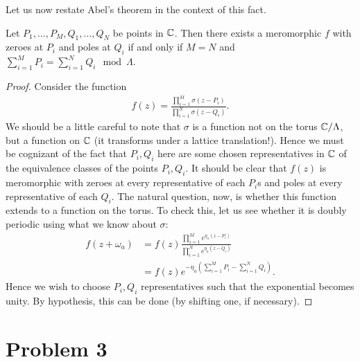 \documentclass{../mathnotes}
\begin{document}
Let us now restate Abel's theorem in the context of this fact.
\begin{thm}
    Let $P_1,\ldots,P_M,Q_1,\ldots,Q_N$ be points in $\mathbb{C}$. Then there exists a meromorphic $f$ with zeroes at $P_i$ and poles at $Q_i$
    if and only if $M=N$ and $\sum_{i=1}^M P_i=\sum_{i=1}^NQ_i\mod\Lambda$.
\end{thm}
\begin{proof}
    Consider the function
    \begin{align*}
        f(z)=\frac{\prod_{i=1}^M\sigma(z-P_i)}{\prod_{i=1}^N\sigma(z-Q_i)}.
    \end{align*}
    We should be a little careful to note that $\sigma$ is a function not on the torus $\mathbb{C}/\Lambda$, but a function on $\mathbb{C}$ (it transforms under a lattice
    translation!). Hence we must be cognizant of the fact that $P_i,Q_i$ here are some chosen representatives in $\mathbb{C}$ of the equivalence classes of the points $P_i,Q_i$.
    It should be clear that $f(z)$ is meromorphic with zeroes at every representative of each $P_i$s and poles at every representative of each $Q_i$.
    The natural question, now, is whether this function extends to a function on the torus. 
    To check this, let us see whether it is doubly periodic using what we know about $\sigma$:
    \begin{align*}
        f(z+\omega_a)&=f(z)\frac{\prod_{i=1}^Me^{\eta_a(z-P_i)}}{\prod_{i=1}^Ne^{\eta_a(z-Q_i)}}\\
        &=f(z)e^{-\eta_a\left( \sum_{i=1}^MP_i-\sum_{i=1}^NQ_i \right)}.
    \end{align*}
    Hence we wish to choose $P_i,Q_i$ representatives such that the exponential becomes unity. By hypothesis, this can be done (by shifting one, if necessary).
\end{proof}

\section*{Problem 3}
\end{document}
